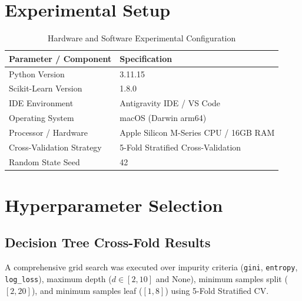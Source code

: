 \documentclass[12pt,a4paper]{article}
\begin{document}
\section{Experimental Setup}
\begin{table}[H]
\centering
\begin{tabular}{ll}
\toprule
\textbf{Parameter / Component} & \textbf{Specification} \\
\midrule
Python Version & 3.11.15 \\
Scikit-Learn Version & 1.8.0 \\
IDE Environment & Antigravity IDE / VS Code \\
Operating System & macOS (Darwin arm64) \\
Processor / Hardware & Apple Silicon M-Series CPU / 16GB RAM \\
Cross-Validation Strategy & 5-Fold Stratified Cross-Validation \\
Random State Seed & 42 \\
\bottomrule
\end{tabular}
\caption{Hardware and Software Experimental Configuration}
\end{table}

\section{Hyperparameter Selection}

\subsection{Decision Tree Cross-Fold Results}
A comprehensive grid search was executed over impurity criteria (\texttt{gini}, \texttt{entropy}, \texttt{log\_loss}), maximum depth ($d \in [2, 10]$ and None), minimum samples split ($[2, 20]$), and minimum samples leaf ($[1, 8]$) using 5-Fold Stratified CV.
\end{document}
